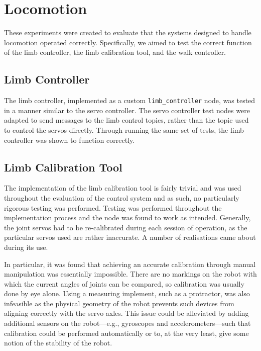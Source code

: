 \section{Locomotion}

These experiments were created to evaluate that the systems designed to handle locomotion operated correctly. Specifically, we aimed to test the correct function of the limb controller, the limb calibration tool, and the walk controller.

\subsection{Limb Controller}

The limb controller, implemented as a custom \texttt{limb\_controller} node, was tested in a manner similar to the servo controller. The servo controller test nodes were adapted to send messages to the limb control topics, rather than the topic used to control the servos directly. Through running the same set of tests, the limb controller was shown to function correctly.

\subsection{Limb Calibration Tool}

The implementation of the limb calibration tool is fairly trivial and was used throughout the evaluation of the control system and as such, no particularly rigorous testing was performed. Testing was performed throughout the implementation process and the node was found to work as intended. Generally, the joint servos had to be re-calibrated during each session of operation, as the particular servos used are rather inaccurate. A number of realisations came about during its use.

In particular, it was found that achieving an accurate calibration through manual manipulation was essentially impossible. There are no markings on the robot with which the current angles of joints can be compared, so calibration was usually done by eye alone. Using a measuring implement, such as a protractor, was also infeasible as the physical geometry of the robot prevents such devices from aligning correctly with the servo axles. This issue could be alleviated by adding additional sensors on the robot---e.g., gyroscopes and accelerometers---such that calibration could be performed automatically or to, at the very least, give some notion of the stability of the robot.

